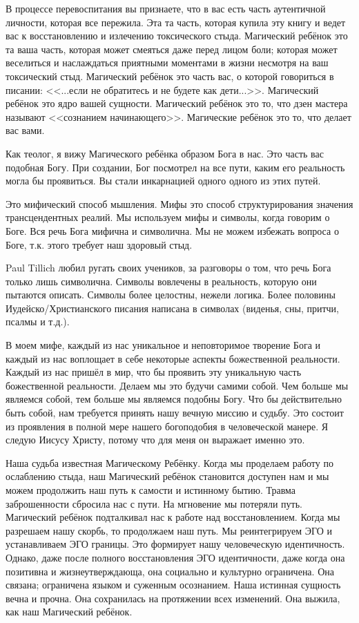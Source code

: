 \documentclass[10pt, fleqn]{article}
\begin{document}
В процессе перевоспитания вы признаете, что в вас есть часть аутентичной личности, которая все пережила. Эта та часть, которая купила эту книгу и ведет вас к восстановлению и излечению токсического стыда. Магический ребёнок это та ваша часть, которая может смеяться даже перед лицом боли; которая может веселиться и наслаждаться приятными моментами в жизни несмотря на ваш токсический стыд. Магический ребёнок это часть вас, о которой говориться в писании: <<...если не обратитесь и не будете как дети...>>. Магический ребёнок это ядро вашей сущности. Магический ребёнок это то, что дзен мастера называют <<сознанием начинающего>>. Магические ребёнок это то, что делает вас вами.

Как теолог, я вижу Магического ребёнка образом Бога в нас. Это часть вас подобная Богу. При создании, Бог посмотрел на все пути, каким его реальность могла бы проявиться. Вы стали инкарнацией одного одного из этих путей.

Это мифический способ мышления. Мифы это способ структурирования значения трансцендентных реалий. Мы используем мифы и символы, когда говорим о Боге. Вся речь Бога мифична и символична. Мы не можем избежать вопроса о Боге, т.к. этого требует наш здоровый стыд.

Paul Tillich любил ругать своих учеников, за разговоры о том, что речь Бога только лишь символична. Символы вовлечены в реальность, которую они пытаются описать. Символы более целостны, нежели логика. Более половины Иудейско/Христианского писания написана в символах (виденья, сны, притчи, псалмы и т.д.).

В моем мифе, каждый из нас уникальное и неповторимое творение Бога и каждый из нас воплощает в себе некоторые аспекты божественной реальности. Каждый из нас пришёл в мир, что бы проявить эту уникальную часть божественной реальности. Делаем мы это будучи самими собой. Чем больше мы являемся собой, тем больше мы являемся подобны Богу. Что бы действительно быть собой, нам требуется принять нашу вечную миссию и судьбу. Это состоит из проявления в полной мере нашего богоподобия в человеческой манере. Я следую Иисусу Христу, потому что для меня он выражает именно это.

Наша судьба известная Магическому Ребёнку. Когда мы проделаем работу по ослаблению стыда, наш Магический ребёнок становится доступен нам и мы можем продолжить наш путь к самости и истинному бытию. Травма заброшенности сбросила нас с пути. На мгновение мы потеряли путь. Магический ребёнок подталкивал нас к работе над восстановлением. Когда мы разрешаем нашу скорбь, то продолжаем наш путь. Мы реинтегрируем ЭГО и устанавливаем ЭГО границы. Это формирует нашу человеческую идентичность. Однако, даже после полного восстановления ЭГО идентичности, даже когда она позитивна и жизнеутверждающа, она социально и культурно ограничена. Она связана; ограничена языком и суженным осознанием. Наша истинная сущность вечна и прочна. Она сохранилась на протяжении всех изменений. Она выжила, как наш Магический ребёнок.
\end{document}

